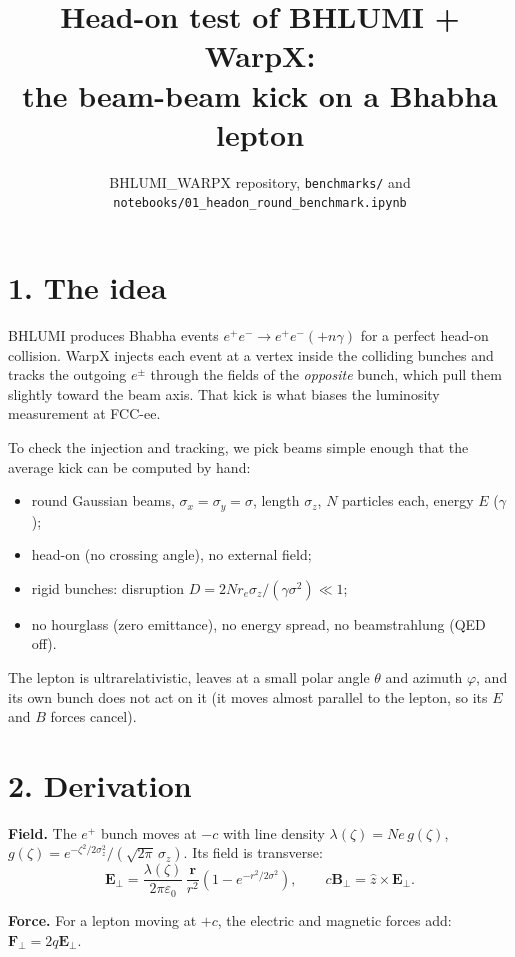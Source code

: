 \documentclass[11pt]{article}
\title{Head-on test of BHLUMI + WarpX:\\ the beam-beam kick on a Bhabha lepton}
\author{BHLUMI\_WARPX repository, \texttt{benchmarks/} and \texttt{notebooks/01\_headon\_round\_benchmark.ipynb}}
\date{}
\begin{document}
\maketitle

\section*{1. The idea}

BHLUMI produces Bhabha events $e^+e^-\to e^+e^-(+n\gamma)$ for a perfect head-on collision. WarpX injects each
event at a vertex inside the colliding bunches and tracks the outgoing $e^\pm$ through the fields of the
\emph{opposite} bunch, which pull them slightly toward the beam axis. That kick is what biases the luminosity
measurement at FCC-ee.

To check the injection and tracking, we pick beams simple enough that the average kick can be computed by hand:
\begin{itemize}
  \item round Gaussian beams, $\sigma_x=\sigma_y=\sigma$, length $\sigma_z$, $N$ particles each, energy $E$ ($\gamma$);
  \item head-on (no crossing angle), no external field;
  \item rigid bunches: disruption $D = 2Nr_e\sigma_z/(\gamma\sigma^2)\ll 1$;
  \item no hourglass (zero emittance), no energy spread, no beamstrahlung (QED off).
\end{itemize}
The lepton is ultrarelativistic, leaves at a small polar angle $\theta$ and azimuth $\varphi$, and its own
bunch does not act on it (it moves almost parallel to the lepton, so its $E$ and $B$ forces cancel).

\section*{2. Derivation}

\textbf{Field.} The $e^+$ bunch moves at $-c$ with line density $\lambda(\zeta)=Ne\,g(\zeta)$,
$g(\zeta)=e^{-\zeta^2/2\sigma_z^2}/(\sqrt{2\pi}\,\sigma_z)$. Its field is transverse:
\begin{equation}
\mathbf E_\perp=\frac{\lambda(\zeta)}{2\pi\varepsilon_0}\,\frac{\mathbf r}{r^2}\left(1-e^{-r^2/2\sigma^2}\right),
\qquad c\mathbf B_\perp=\hat z\times\mathbf E_\perp .
\end{equation}

\textbf{Force.} For a lepton moving at $+c$, the electric and magnetic forces add: $\mathbf F_\perp=2q\mathbf E_\perp$.
\end{document}
